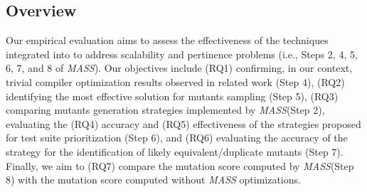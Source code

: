 


\subsection{Overview}
\label{sec:evaluation}

\renewcommand{\APPR}{\textit{MASS}\xspace}

\STARTCHANGEDNOV

Our empirical evaluation aims to assess the effectiveness of the techniques integrated into \INDEX{\APPR} to address scalability and pertinence problems (i.e., Steps 2, 4, 5, 6, 7, and 8 of \APPR). Our objectives include (RQ1) confirming, in our context, trivial compiler optimization results observed in related work (Step 4), (RQ2) identifying the most effective solution for mutants sampling (Step 5), (RQ3) comparing mutants generation strategies implemented by \APPR (Step 2), evaluating the (RQ4) accuracy and (RQ5) effectiveness of the strategies proposed  for test suite prioritization (Step 6), and (RQ6) evaluating the accuracy of the strategy for the identification of likely equivalent/duplicate mutants (Step 7). Finally, we aim to (RQ7) compare the mutation score computed by \APPR (Step 8) with the mutation score computed without \APPR optimizations.


